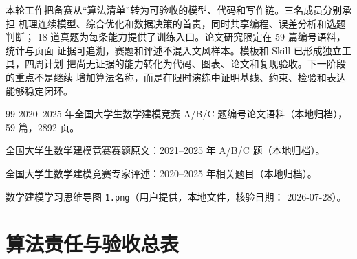 \documentclass[UTF8,a4paper,12pt]{ctexart}
\begin{document}
本轮工作把备赛从“算法清单”转为可验收的模型、代码和写作链。三名成员分别承担
机理连续模型、综合优化和数据决策的首责，同时共享编程、误差分析和选题判断；
18 道真题为每条能力提供了训练入口。论文研究限定在 59 篇编号语料，统计与页面
证据可追溯，赛题和评述不混入文风样本。模板和 Skill 已形成独立工具，四周计划
把尚无证据的能力转化为代码、图表、论文和复现验收。下一阶段的重点不是继续
增加算法名称，而是在限时演练中证明基线、约束、检验和表达能够稳定闭环。

\begin{thebibliography}{99}
2020--2025 年全国大学生数学建模竞赛 A/B/C 题编号论文语料（本地归档），
59 篇，2892 页。

全国大学生数学建模竞赛赛题原文：2021--2025 年 A/B/C 题（本地归档）。

全国大学生数学建模竞赛专家评述：2020--2025 年相关题目（本地归档）。

数学建模学习思维导图 \texttt{1.png}（用户提供，本地文件，核验日期：
2026-07-28）。
\end{thebibliography}

\appendix
\section{算法责任与验收总表}
\end{document}
